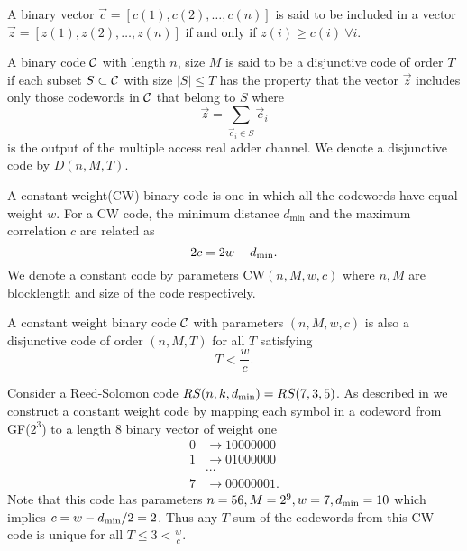 \begin{definition}
A binary vector $\vec{c}=[c(1),c(2),\ldots,c(n)]$ is said to be included in a vector  $\vec{z}=[z(1),z(2),\ldots,z(n)]$ if and only if $z(i)\geq c(i)~\forall i$.
\end{definition}

\begin{definition}
A binary code $\mathcal{C}$ with length $n$, size $M$ is said to be a disjunctive code of order $T$ if each subset $S\subset \mathcal{C}$ with size $|S|\leq T$ has the property that the vector $\vec{z}$ includes only those codewords in $\mathcal{C}$ that belong to $S$ where
\begin{equation}
\vec{z}=\sum_{\vec{c}_i\in S}\vec{c}_i
\label{eqn:mac_adder}
\end{equation}
is the output of the multiple access real adder channel. We denote a disjunctive code by $D(n,M,T)$.
\end{definition}

\begin{definition}
A constant weight(CW) binary code is one in which all the codewords have equal weight $w$. For a CW code, the minimum distance $d_{\text{min}}$ and the maximum correlation $c$ are related as
\[
2c=2w-d_{\mathrm{min}}.
\]
We denote a constant code by parameters CW$(n,M,w,c)$ where $n, M$ are blocklength and size of the code respectively.
\end{definition}
\begin{lemma}
\label{lem:fandisjunctive_code}
A constant weight binary code $\mathcal{C}$ with parameters $(n,M,w,c)$ is also a disjunctive code of order $(n,M,T)$ for all $T$ satisfying
\[
T<\frac{w}{c}.
\]
\end{lemma}

\begin{example}
Consider a Reed-Solomon code $RS(n,k,d_{\mathrm{min}})=RS(7,3,5)$. As described in \cite{fan1995superimposed} we construct a constant weight code by mapping each symbol in a codeword from GF($2^3$) to a length $8$ binary vector of weight one
\begin{align*}
0&\rightarrow 10000000\\
1&\rightarrow 01000000\\
&\cdots	\\
7&\rightarrow 00000001.
\end{align*}
Note that this code has parameters $n=56,M=2^9, w=7,d_{\mathrm{min}}=10$ which implies $c=w-d_{\mathrm{min}}/2=2$. Thus any $T$-sum of the codewords from this CW code is unique for all $T\leq 3<\frac{w}{c}$.
\end{example}

